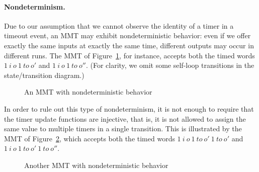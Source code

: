 \paragraph{Nondeterminism.}
Due to our assumption that we cannot observe the identity of a timer in a timeout event, an MMT may exhibit nondeterministic
behavior: even if we offer exactly the same inputs at exactly the same time, different outputs may occur in different runs. 
The MMT of Figure~\ref{fig:nondeterminism}, for instance, accepts both the timed words
$1 ~ i ~ o ~ 1 ~ \mathit{to} ~ o'$ and $1 ~ i ~ o ~ 1 ~ \mathit{to} ~ o''$.
(For clarity, we omit some self-loop transitions in the state/transition diagram.)
\begin{figure}[ht]
\begin{center}
\caption{An MMT with nondeterministic behavior}
\label{fig:nondeterminism}
\end{center}
\end{figure}
\iflong
In order to rule out this type of nondeterminism, it is not enough to require that the timer update functions are injective,
that is, it is not allowed to assign the same value to multiple timers in a single transition.
This is illustrated by the MMT of Figure~\ref{fig:nondeterminism2}, which accepts both the timed words
$1 ~ i ~ o ~ 1 ~ \mathit{to} ~ o'~ 1 ~ \mathit{to} ~ o'$ and $1 ~ i ~ o ~ 1 ~ \mathit{to} ~ o' ~ 1 ~ \mathit{to} ~ o''$.
\begin{figure}[ht]
\begin{center}
\caption{Another MMT with nondeterministic behavior}
\label{fig:nondeterminism2}
\end{center}
\end{figure}
